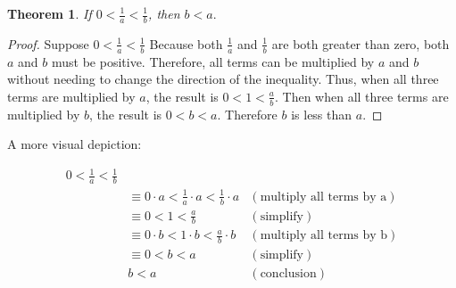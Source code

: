 
\newtheorem{theorem}{Theorem}

\begin{theorem}
  If $0 < \frac{1}{a} < \frac{1}{b}$, then $b < a.$
\end{theorem}

\begin{proof}
  Suppose $0 < \frac{1}{a} < \frac{1}{b}$ Because both $\frac{1}{a}$ and
  $\frac{1}{b}$ are both greater than zero, both $a$ and $b$ must be positive.
  Therefore, all terms can be multiplied by $a$ and $b$ without needing to
  change the direction of the inequality. Thus, when all three terms are
  multiplied by $a$, the result is $0 < 1 < \frac{a}{b}$. Then when all three
  terms are multiplied by $b$, the result is $0 < b < a$. Therefore $b$ is less
  than $a$.
\end{proof}

A more visual depiction:


\begin{align*}
  0 < \frac{1}{a} < \frac{1}{b}\\  
  &\equiv 0 \cdot a < \frac{1}{a} \cdot a < \frac{1}{b} \cdot a
    &(\textrm{multiply all terms by a})\\
  &\equiv 0 < 1 < \frac{a}{b} &(\textrm{simplify})\\
  &\equiv 0 \cdot b < 1 \cdot b < \frac{a}{b} \cdot b &(\textrm{multiply all
    terms by b})\\
  & \equiv 0 < b < a &(\textrm{simplify})\\
  & b < a &(\textrm{conclusion})
\end{align*}
